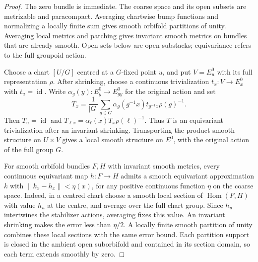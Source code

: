 \documentclass[11pt,a4paper,reqno]{amsart}
\numberwithin{equation}{section}
\theoremstyle{remark}
\theoremstyle{plain}
\newcommand{\id}{\operatorname{id}}
\begin{document}
\begin{proof}
The zero bundle is immediate. The coarse space and its open subsets are
metrizable and paracompact. Averaging chartwise bump functions and
normalizing a locally finite sum gives smooth orbifold partitions of unity.
Averaging local metrics and patching gives invariant smooth metrics on
bundles that are already smooth. Open sets below are open substacks;
equivariance refers to the full groupoid action.

Choose a chart $[U/G]$ centred at a $G$-fixed point $u$, and put $V=E^0_u$
with its full representation $\rho$. After shrinking, choose a continuous
trivialization $t_x:V\to E^0_x$ with $t_u=\id$. Write
$\alpha_g(y):E^0_y\to E^0_{gy}$ for the original action and set
\[
 T_x=\frac1{|G|}\sum_{g\in G}
       \alpha_g(g^{-1}x)t_{g^{-1}x}\rho(g)^{-1}.
\]
Then $T_u=\id$ and
$T_{\ell x}=\alpha_\ell(x)T_x\rho(\ell)^{-1}$.
Thus $T$ is an equivariant trivialization after an invariant shrinking.
Transporting the product smooth structure on $U\times V$ gives a local
smooth structure on $E^0$, with the original action of the full group $G$.

For smooth orbifold bundles $F,H$ with invariant smooth metrics, every
continuous equivariant map $h:F\to H$
admits a smooth equivariant approximation $k$ with
$\|k_x-h_x\|<\eta(x)$, for any positive continuous function $\eta$ on the
coarse space. Indeed, in a centred chart choose a smooth local section of
$\operatorname{Hom}(F,H)$ with value $h_u$ at the centre, and average over
the full chart group. Since $h_u$ intertwines the stabilizer actions,
averaging fixes this value. An invariant shrinking makes the error less
than $\eta/2$. A locally finite smooth partition of unity combines these
local sections with the same error bound. Each partition support is closed
in the ambient open suborbifold and contained in its section domain, so
each term extends smoothly by zero.


\end{proof}
\end{document}
